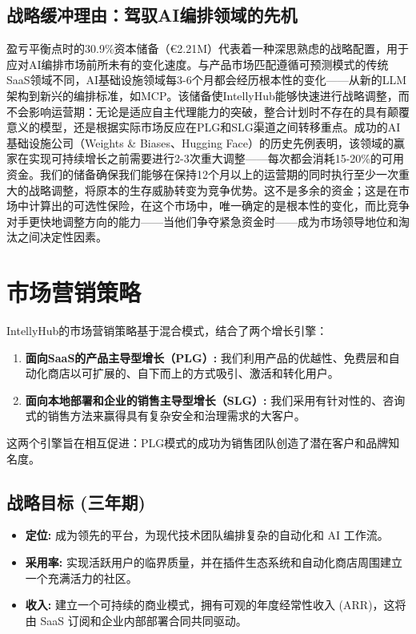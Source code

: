 \documentclass[11pt, a4paper, oneside]{article}
\begin{document}
\subsection{战略缓冲理由：驾驭AI编排领域的先机}
盈亏平衡点时的30.9\%资本储备（€2.21M）代表着一种深思熟虑的战略配置，用于应对AI编排市场前所未有的变化速度。与产品市场匹配遵循可预测模式的传统SaaS领域不同，AI基础设施领域每3-6个月都会经历根本性的变化——从新的LLM架构到新兴的编排标准，如MCP。该储备使IntellyHub能够快速进行战略调整，而不会影响运营期：无论是适应自主代理能力的突破，整合计划时不存在的具有颠覆意义的模型，还是根据实际市场反应在PLG和SLG渠道之间转移重点。成功的AI基础设施公司（Weights \& Biases、Hugging Face）的历史先例表明，该领域的赢家在实现可持续增长之前需要进行2-3次重大调整——每次都会消耗15-20\%的可用资金。我们的储备确保我们能够在保持12个月以上的运营期的同时执行至少一次重大的战略调整，将原本的生存威胁转变为竞争优势。这不是多余的资金；这是在市场中计算出的可选性保险，在这个市场中，唯一确定的是根本性的变化，而比竞争对手更快地调整方向的能力——当他们争夺紧急资金时——成为市场领导地位和淘汰之间决定性因素。

\newpage
\section{市场营销策略}

IntellyHub的市场营销策略基于混合模式，结合了两个增长引擎：
\begin{enumerate}
    \item \textbf{面向SaaS的产品主导型增长（PLG）:} 我们利用产品的优越性、免费层和自动化商店以可扩展的、自下而上的方式吸引、激活和转化用户。
    \item \textbf{面向本地部署和企业的销售主导型增长（SLG）:} 我们采用有针对性的、咨询式的销售方法来赢得具有复杂安全和治理需求的大客户。
\end{enumerate}
这两个引擎旨在相互促进：PLG模式的成功为销售团队创造了潜在客户和品牌知名度。



\subsection{战略目标 (三年期)}
\begin{itemize}
    \item \textbf{定位:} 成为领先的平台，为现代技术团队编排复杂的自动化和 AI 工作流。
    \item \textbf{采用率:} 实现活跃用户的临界质量，并在插件生态系统和自动化商店周围建立一个充满活力的社区。
    \item \textbf{收入:} 建立一个可持续的商业模式，拥有可观的年度经常性收入 (ARR)，这将由 SaaS 订阅和企业内部部署合同共同驱动。
\end{itemize}
\end{document}
